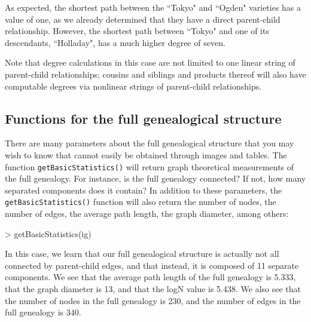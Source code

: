 \documentclass{article}
\numberwithin{equation}{section} %
\begin{document}
As expected, the shortest path between the ``Tokyo" and ``Ogden" varieties has a value of one, as we already determined that they have a direct parent-child relationship. However, the shortest path between ``Tokyo" and one of its descendants, ``Holladay", has a much higher degree of seven.

Note that degree calculations in this case are not limited to one linear string of parent-child relationships; cousins and siblings and products thereof will also have computable degrees via nonlinear strings of parent-child relationships.

\subsection{Functions for the full genealogical structure}

There are many parameters about the full genealogical structure that you may wish to know that cannot easily be obtained through images and tables. The function \texttt{getBasicStatistics()} will return graph theoretical measurements of the full genealogy. For instance, is the full genealogy connected? If not, how many separated components does it contain? In addition to these parameters, the \texttt{getBasicStatistics()} function will also return the number of nodes, the number of edges, the average path length, the graph diameter, among others:

\begin{Schunk}
\begin{Sinput}
> getBasicStatistics(ig)
\end{Sinput}
\end{Schunk}

In this case, we learn that our full genealogical structure is actually not all connected by parent-child edges, and that instead, it is composed of 11 separate components. We see that the average path length of the full genealogy is 5.333, that the graph diameter is 13, and that the logN value is 5.438. We also see that the number of nodes in the full genealogy is 230, and the number of edges in the full genealogy is 340.
\end{document}
